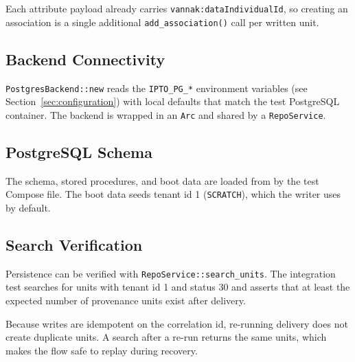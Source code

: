 Each attribute payload already carries \texttt{vannak:dataIndividualId}, so
creating an association is a single additional \texttt{add\_association()} call
per written unit.

\subsection{Backend Connectivity}

\texttt{PostgresBackend::new} reads the \texttt{IPTO\_PG\_*} environment
variables (see Section~\ref{sec:configuration}) with local defaults that match
the test PostgreSQL container. The backend is wrapped in an \texttt{Arc} and
shared by a \texttt{RepoService}.

\subsection{PostgreSQL Schema}

The \ipto{} schema, stored procedures, and boot data are loaded from
 by the test Compose file. The boot data
seeds tenant id 1 (\texttt{SCRATCH}), which the writer uses by default.

\subsection{Search Verification}

Persistence can be verified with \texttt{RepoService::search\_units}. The
integration test searches for units with tenant id 1 and status 30 and asserts
that at least the expected number of provenance units exist after delivery.

\begin{vnote}
Because writes are idempotent on the correlation id, re-running delivery does
not create duplicate units. A search after a re-run returns the same units,
which makes the flow safe to replay during recovery.
\end{vnote}

\endinput
